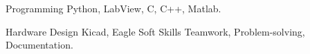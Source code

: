 

\begin{cvskills}

  \cvskill
    {Programming} %
    {Python, LabView, C, C++, Matlab.} %

  \cvskill
    {Hardware Design} %
    {Kicad, Eagle} %
  \cvskill
    {Soft Skills} %
    {Teamwork, Problem-solving, Documentation.} %

\end{cvskills}
